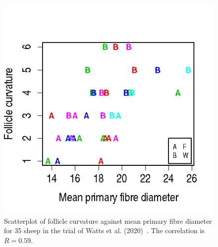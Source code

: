 %

\begin{figure}[]
\centering
    \includegraphics[scale=0.60]{fcdp.png}
  \caption{Scatterplot of follicle curvature against mean primary fibre diameter for 35 sheep in the trial of Watts et al. (2020)~\cite{watts-2020}. The correlation is  $R=0.59$.}
\vfill
  \label{fig:fcdp}
\end{figure}

%


